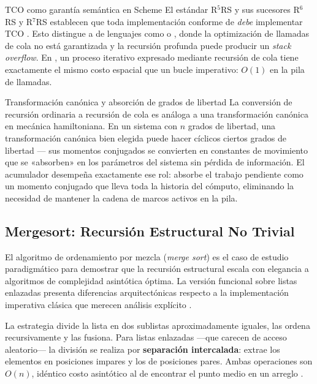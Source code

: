 \begin{observacion}{TCO como garantía semántica en Scheme}
El estándar R$^5$RS y sus sucesores R$^6$RS y R$^7$RS establecen que toda implementación conforme de  \textit{debe} implementar TCO \cite{SICP}. Esto distingue a  de lenguajes como  o , donde la optimización de llamadas de cola no está garantizada y la recursión profunda puede producir un \textit{stack overflow}. En , un proceso iterativo expresado mediante recursión de cola tiene exactamente el mismo costo espacial que un bucle imperativo: $O(1)$ en la pila de llamadas.
\end{observacion}

\begin{fisicaconexion}{Transformación canónica y absorción de grados de libertad}
La conversión de recursión ordinaria a recursión de cola es análoga a una transformación canónica en mecánica hamiltoniana. En un sistema con $n$ grados de libertad, una transformación canónica bien elegida puede hacer cíclicos ciertos grados de libertad — sus momentos conjugados se convierten en constantes de movimiento que se «absorben» en los parámetros del sistema sin pérdida de información. El acumulador  desempeña exactamente ese rol: absorbe el trabajo pendiente como un momento conjugado que lleva toda la historia del cómputo, eliminando la necesidad de mantener la cadena de marcos activos en la pila.
\end{fisicaconexion}

\subsection{Mergesort: Recursión Estructural No Trivial}
\label{subsec:4_5_2_mergesort}

El algoritmo de ordenamiento por mezcla (\textit{merge sort}) es el caso de estudio paradigmático para demostrar que la recursión estructural escala con elegancia a algoritmos de complejidad asintótica óptima. La versión funcional sobre listas enlazadas presenta diferencias arquitectónicas respecto a la implementación imperativa clásica que merecen análisis explícito \cite{SICP}.

La estrategia divide la lista  en dos sublistas aproximadamente iguales, las ordena recursivamente y las fusiona. Para listas enlazadas —que carecen de acceso aleatorio— la división se realiza por \textbf{separación intercalada}:  extrae los elementos en posiciones impares y  los de posiciones pares. Ambas operaciones son $O(n)$, idéntico costo asintótico al de encontrar el punto medio en un arreglo \cite{SICP}.

